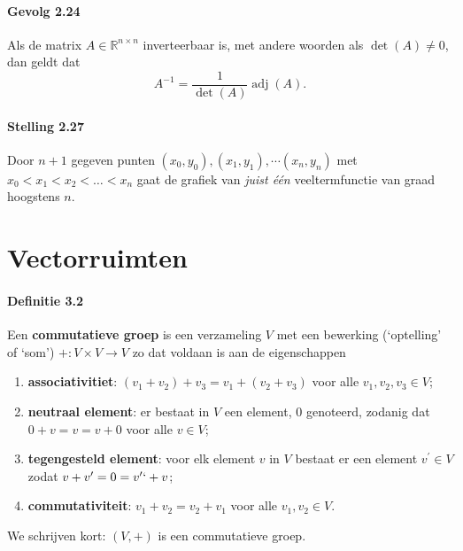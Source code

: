 \documentclass[11pt,oneside,a4paper]{article}
\DeclareMathOperator{\adj}{adj}
\begin{document}
	\paragraph{Gevolg 2.24}
		Als de matrix $A \in \mathbb{R}^{n \times n}$ inverteerbaar is, met andere woorden als $\det(A) \ne 0$, dan geldt dat $$A^{-1} = \frac{1}{\det(A)}\adj(A).$$
	\paragraph{Stelling 2.27}
		Door $n+1$ gegeven punten $(x_0, y_0), (x_1, y_1), \cdots (x_n, y_n)$ met $x_0 < x_1 < x_2 < \ldots < x_n$ gaat de grafiek van \textit{juist één} veeltermfunctie van graad hoogstens $n$. 
		
	\section{Vectorruimten}
	
	\paragraph{Definitie 3.2}
		Een \textbf{commutatieve groep} is een verzameling $V$ met een bewerking (`optelling' of `som') $+: V \times V \to V$ zo dat voldaan is aan de eigenschappen
		\begin{enumerate}
			\item \textbf{associativitiet}: $(v_1 + v_2) + v_3 = v_1 + (v_2 + v_3)$ voor alle $v_1, v_2, v_3 \in V$;
			\item \textbf{neutraal element}: er bestaat in $V$ een element, $0$ genoteerd, zodanig dat $0+v = v = v+0$ voor alle $v \in V$;
			\item \textbf{tegengesteld element}: voor elk element $v$ in $V$ bestaat er een element $v^{\prime} \in V$ zodat $v + v^{\prime} = 0 =v^{\prime}` +v$;
			\item \textbf{commutativiteit}: $v_1 + v_2 = v_2 +v_1$ voor alle $v_1,v_2 \in V$.
		\end{enumerate}
		We schrijven kort: $(V, +)$ is een commutatieve groep.
\end{document}
